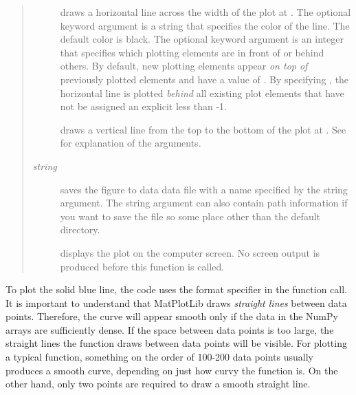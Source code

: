 \documentclass[letterpaper,10pt,english]{sphinxmanual}
\begin{document}
\begin{quote}
\begin{description}
\item[{}] \leavevmode
draws a horizontal line across the width of the plot at .  The optional keyword argument  is a string that specifies the color of the line.  The default color is black.  The optional keyword argument  is an integer that specifies which plotting elements are in front of or behind others.  By default, new plotting elements appear \emph{on top of} previously plotted elements and have a value of .  By specifying , the horizontal line is plotted \emph{behind} all existing plot elements that have not be assigned an explicit  less than -1.

\item[{}] \leavevmode
draws a vertical line from the top to the bottom of the plot at .  See  for explanation of the arguments.

\item[{ \emph{string} \code{)}}] \leavevmode
saves the figure to data data file with a name specified by the string argument.  The string argument can also contain path information if you want to save the file so some place other than the default directory.

\item[{}] \leavevmode
displays the plot on the computer screen.  No screen output is produced before this function is called.

\end{description}
\end{quote}

To plot the solid blue line, the code uses the  format specifier in the  function call.  It is important to understand that MatPlotLib draws \emph{straight lines} between data points.  Therefore, the curve will appear smooth only if the data in the NumPy arrays are sufficiently dense.  If the space between data points is too large, the straight lines the  function draws between data points will be visible.  For plotting a typical function, something on the order of 100-200 data points usually produces a smooth curve, depending on just how curvy the function is.  On the other hand, only two points are required to draw a smooth straight line.
\end{document}

